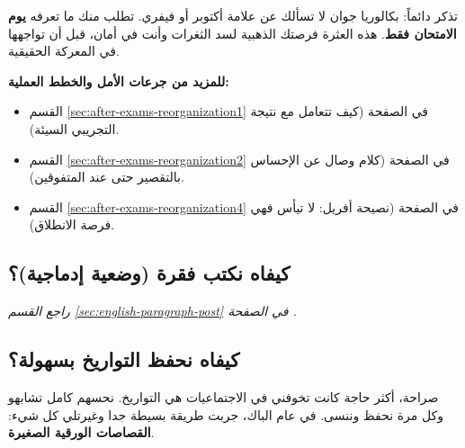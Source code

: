 \documentclass[12pt,a4paper]{book}
\newcommand{\quoteAr}[1]{%
	\begin{myquote}
		\itshape #1
	\end{myquote}
}
\begin{document}
	تذكر دائماً: بكالوريا جوان لا تسألك عن علامة أكتوبر أو فيفري. تطلب منك ما تعرفه \textbf{يوم الامتحان فقط}. هذه العثرة فرصتك الذهبية لسد الثغرات وأنت في أمان، قبل أن تواجهها في المعركة الحقيقية.
	

		\textbf{للمزيد من جرعات الأمل والخطط العملية:}
	\begin{itemize}
		\item القسم \ref{sec:after-exams-reorganization1} في الصفحة \pageref{sec:after-exams-reorganization1} (كيف تتعامل مع نتيجة التجريبي السيئة).
		\item القسم \ref{sec:after-exams-reorganization2} في الصفحة \pageref{sec:after-exams-reorganization2} (كلام وصال عن الإحساس بالتقصير حتى عند المتفوقين).
		\item القسم \ref{sec:after-exams-reorganization4} في الصفحة \pageref{sec:after-exams-reorganization4} (نصيحة أفريل: لا تيأس فهي فرصة الانطلاق).
	\end{itemize}
	
	\subsection*{كيفاه نكتب فقرة (وضعية إدماجية)؟}
	\quoteAr{راجع القسم \ref{sec:english-paragraph-post} في الصفحة \pageref{sec:english-paragraph-post}.}
	
	
	
	\subsection*{كيفاه نحفظ التواريخ بسهولة؟}
	\label{sec:history-dates-story}
	
	صراحة، أكثر حاجة كانت تخوفني في الاجتماعيات هي التواريخ. نحسهم كامل تشابهو وكل مرة نحفظ وننسى. في عام الباك، جربت طريقة بسيطة جدا وغيرتلي كل شيء: \textbf{القصاصات الورقية الصغيرة}.
	
\end{document}
